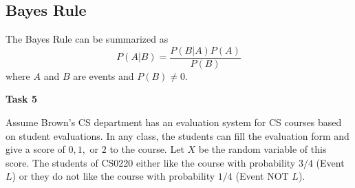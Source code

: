 \documentclass[12pt,letterpaper]{article}
\begin{document}
\newpage

\subsection*{Bayes Rule}
The Bayes Rule can be summarized as
$$P(A|B) = \frac{P(B|A)P(A)}{P(B)}$$
where $A$ and $B$ are events and $P(B) \neq 0$.

\textbf{Task 5}
\renewcommand{\neg}{\textrm{NOT }}


Assume Brown's CS department has an evaluation system for CS courses based on student evaluations. In any class, the students can fill the evaluation form and give a score of $0,1,$ or $2$ to the course.
Let $X$ be the random variable of this score. The students of CS0220 either like the course with probability $3/4$ (Event $L$) or they do not like the course with probability $1/4$ (Event $\neg L$).
\end{document}
